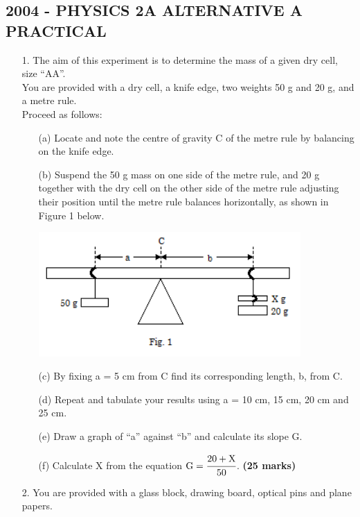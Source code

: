 \subsection{2004 - PHYSICS 2A ALTERNATIVE A PRACTICAL}

\begin{enumerate}
\item[1.] The aim of this experiment is to determine the mass of a given dry cell, size ``AA''.\\[5pt]

You are provided with a dry cell, a knife edge, two weights 50 g and 20 g, and a metre rule.\\[5pt]

Proceed as follows:
\begin{enumerate}
\item[(a)] Locate and note the centre of gravity C of the metre rule by balancing on the knife edge.
\item[(b)] Suspend the 50 g mass on one side of the metre rule, and 20 g together with the dry cell on the other side of the metre rule adjusting their position until the metre rule balances horizontally, as shown in Figure 1 below.

\begin{center}
\includegraphics[width=10cm]{./img/2004-1-alt.png}
\end{center}

\item[(c)] By fixing a = 5 cm from C find its corresponding length, b, from C.
\item[(d)] Repeat and tabulate your results using a = 10 cm, 15 cm, 20 cm and 25 cm.
\item[(e)] Draw a graph of ``a'' against ``b'' and calculate its slope G.
\item[(f)] Calculate X from the equation $\text{G} = \cfrac{20 + \text{X}}{50}$. \hfill \textbf{(25 marks)}
\end{enumerate}


\item[2.] You are provided with a glass block, drawing board, optical pins and plane papers.\\


\end{enumerate}
